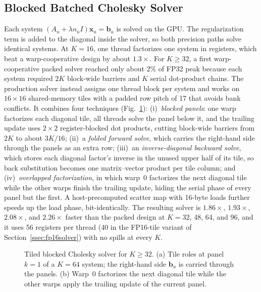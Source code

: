 \subsection{Blocked Batched Cholesky Solver}
\label{ssec:cholesky}

Each system $(A_u + \lambda n_u I)\mathbf{x}_u = \mathbf{b}_u$ is solved on the GPU. The regularization term is added to the diagonal inside the solver, so both precision paths solve identical systems. At $K=16$, one thread factorizes one system in registers, which beat a warp-cooperative design by about $1.3\times$. For $K \ge 32$, a first warp-cooperative packed solver reached only about $2\%$ of FP32 peak because each system required $2K$ block-wide barriers and $K$ serial dot-product chains. The production solver instead assigns one thread block per system and works on $16 \times 16$ shared-memory tiles with a padded row pitch of 17 that avoids bank conflicts. It combines four techniques (Fig.~\ref{fig:cholesky}):
(i)~\textit{blocked panels}: one warp factorizes each diagonal tile, all threads solve the panel below it, and the trailing update uses $2 \times 2$ register-blocked dot products, cutting block-wide barriers from $2K$ to about $3K/16$; (ii)~a \textit{folded forward solve}, which carries the right-hand side through the panels as an extra row; (iii)~an \textit{inverse-diagonal backward solve}, which stores each diagonal factor's inverse in the unused upper half of its tile, so back substitution becomes one matrix--vector product per tile column; and (iv)~\textit{overlapped factorization}, in which warp~0 factorizes the next diagonal tile while the other warps finish the trailing update, hiding the serial phase of every panel but the first.
A host-precomputed scatter map with 16-byte loads further speeds up the load phase, bit-identically. The resulting solver is $1.86\times$, $1.93\times$, $2.08\times$, and $2.26\times$ faster than the packed design at $K = 32$, 48, 64, and 96, and it uses 56 registers per thread (40 in the FP16-tile variant of Section~\ref{ssec:fp16solver}) with no spills at every $K$.

\begin{figure}[!t]
\centering

\caption{Tiled blocked Cholesky solver for $K \ge 32$. (a) Tile roles at panel $k{=}1$ of a $K{=}64$ system; the right-hand side $\mathbf{b}_u$ is carried through the panels. (b) Warp~0 factorizes the next diagonal tile while the other warps apply the trailing update of the current panel.}
\label{fig:cholesky}
\end{figure}

